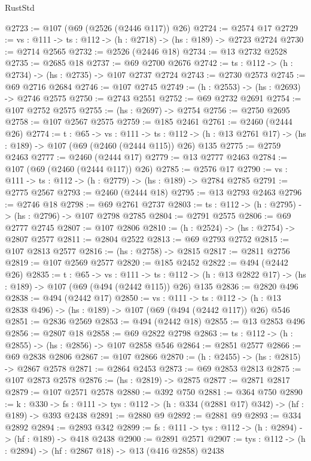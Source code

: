 \begin{lexlean}{RustStd}
\begin{coremodule}
@2723 := @107 (@69 (@2526 (@2446 @117)) @26)
@2724 := @2574 @17
@2729 := {vs : @111} -> {ts : @112} -> (h : @2718) -> (hs : @189) -> @2723 @2724
@2730 := @2714 @2565
@2732 := @2526 (@2446 @18)
@2734 := @13 @2732 @2528
@2735 := @2685 @18
@2737 := @69 @2700 @2676
@2742 := {ts : @112} -> (h : @2734) -> (hs : @2735) -> @107 @2737 @2724
@2743 := @2730 @2573
@2745 := @69 @2716 @2684
@2746 := @107 @2745
@2749 := (h : @2553) -> (hs : @2693) -> @2746 @2575
@2750 := @2743 @2551
@2752 := @69 @2732 @2691
@2754 := @107 @2752 @2575
@2755 := (hs : @2697) -> @2754
@2756 := @2750 @2695
@2758 := @107 @2567 @2575
@2759 := @185 @2461
@2761 := @2460 (@2444 @26)
@2774 := {t : @65} ->
  {vs : @111} ->
  {ts : @112} -> (h : @13 @2761 @17) -> (hs : @189) -> @107 (@69 (@2460 (@2444 @115)) @26) @135
@2775 := @2759 @2463
@2777 := @2460 (@2444 @17)
@2779 := @13 @2777 @2463
@2784 := @107 (@69 (@2460 (@2444 @117)) @26)
@2785 := @2576 @17
@2790 := {vs : @111} -> {ts : @112} -> (h : @2779) -> (hs : @189) -> @2784 @2785
@2791 := @2775 @2567
@2793 := @2460 (@2444 @18)
@2795 := @13 @2793 @2463
@2796 := @2746 @18
@2798 := @69 @2761 @2737
@2803 := {ts : @112} -> (h : @2795) -> (hs : @2796) -> @107 @2798 @2785
@2804 := @2791 @2575
@2806 := @69 @2777 @2745
@2807 := @107 @2806
@2810 := (h : @2524) -> (hs : @2754) -> @2807 @2577
@2811 := @2804 @2522
@2813 := @69 @2793 @2752
@2815 := @107 @2813 @2577
@2816 := (hs : @2758) -> @2815
@2817 := @2811 @2756
@2819 := @107 @2569 @2577
@2820 := @185 @2452
@2822 := @494 (@2442 @26)
@2835 := {t : @65} ->
  {vs : @111} ->
  {ts : @112} -> (h : @13 @2822 @17) -> (hs : @189) -> @107 (@69 (@494 (@2442 @115)) @26) @135
@2836 := @2820 @496
@2838 := @494 (@2442 @17)
@2850 := {vs : @111} ->
  {ts : @112} -> (h : @13 @2838 @496) -> (hs : @189) -> @107 (@69 (@494 (@2442 @117)) @26) @546
@2851 := @2836 @2569
@2853 := @494 (@2442 @18)
@2855 := @13 @2853 @496
@2856 := @2807 @18
@2858 := @69 @2822 @2798
@2863 := {ts : @112} -> (h : @2855) -> (hs : @2856) -> @107 @2858 @546
@2864 := @2851 @2577
@2866 := @69 @2838 @2806
@2867 := @107 @2866
@2870 := (h : @2455) -> (hs : @2815) -> @2867 @2578
@2871 := @2864 @2453
@2873 := @69 @2853 @2813
@2875 := @107 @2873 @2578
@2876 := (hs : @2819) -> @2875
@2877 := @2871 @2817
@2879 := @107 @2571 @2578
@2880 := @392 @750
@2881 := @364 @750
@2890 := {k : @330} ->
  {fs : @111} -> {tys : @112} -> (h : @334 (@2881 @17) @342) -> (hf : @189) -> @393 @2438
@2891 := @2880 @9
@2892 := @2881 @9
@2893 := @334 @2892
@2894 := @2893 @342
@2899 := {fs : @111} -> {tys : @112} -> (h : @2894) -> (hf : @189) -> @418 @2438
@2900 := @2891 @2571
@2907 := {tys : @112} -> (h : @2894) -> (hf : @2867 @18) -> @13 (@416 @2858) @2438

\end{coremodule}
\end{lexlean}
